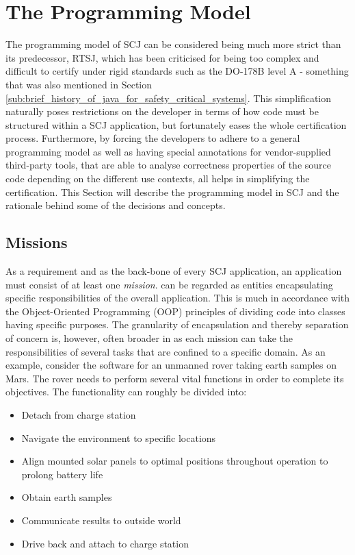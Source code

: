 \section{The Programming Model}
\label{section:programmingmodel}
The programming model of SCJ can be considered being much more strict than its predecessor, RTSJ, which has been criticised for being too complex and difficult to certify under rigid standards such as the DO-178B level A - something that was also mentioned in Section \ref{sub:brief_history_of_java_for_safety_critical_systems}. This simplification naturally poses restrictions on the developer in terms of how code must be structured within a SCJ application, but fortunately eases the whole certification process. Furthermore, by forcing the developers to adhere to a general programming model as well as having special annotations for vendor-supplied third-party tools, that are able to analyse correctness properties of the source code depending on the different use contexts, all helps in simplifying the certification. This Section will describe the programming model in SCJ and the rationale behind some of the decisions and concepts.


\subsection{Missions}
As a requirement and as the back-bone of every SCJ application, an application must consist of at least one \textit{mission}.  can be regarded as entities encapsulating specific responsibilities of the overall application. This is much in accordance with the Object-Oriented Programming (OOP) principles of dividing code into classes having specific purposes. The granularity of encapsulation and thereby separation of concern is, however, often broader in  as each mission can take the responsibilities of several tasks that are confined to a specific domain. As an example, consider the software for an unmanned rover taking earth samples on Mars. The rover needs to perform several vital functions in order to complete its objectives. The functionality can roughly be divided into:

\begin{itemize}
	\item Detach from charge station
	\item Navigate the environment to specific locations
	\item Align mounted solar panels to optimal positions throughout operation to prolong battery life
	\item Obtain earth samples
	\item Communicate results to outside world
	\item Drive back and attach to charge station
\end{itemize}


